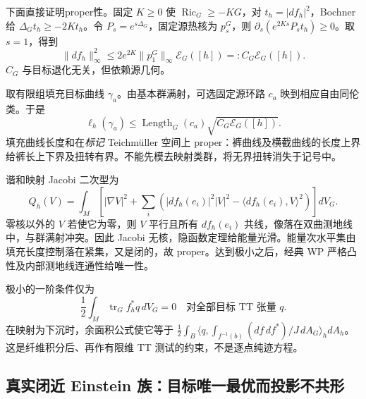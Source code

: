 \documentclass[UTF8,fontset=fandol,zihao=-4,oneside,openany]{ctexbook}
\theoremstyle{cjkplain}
\numberwithin{equation}{chapter}
\begin{document}
下面直接证明proper性。固定 $K\ge0$ 使 $\operatorname{Ric}_G\ge-KG$，对 $t_h=|df_h|^2$，Bochner 给
$\Delta_Gt_h\ge-2Kt_h$。令 $P_s=e^{s\Delta_G}$，固定源热核为 $p_s^G$，则
$\partial_s(e^{2Ks}P_st_h)\ge0$。取 $s=1$，得到
\begin{equation}\label{SUB:heat-kernel-gradient}
\|df_h\|_\infty^2
\le2e^{2K}\|p_1^G\|_\infty\mathcal E_G([h])=:C_G\mathcal E_G([h]).
\end{equation}
$C_G$ 与目标退化无关，但依赖源几何。

取有限组填充目标曲线 $\gamma_a$。由基本群满射，可选固定源环路 $c_a$ 映到相应自由同伦类。于是
\[
\ell_h(\gamma_a)\le\operatorname{Length}_G(c_a)\sqrt{C_G\mathcal E_G([h])}.
\]
填充曲线长度和在\emph{标记} Teichmüller 空间上 proper：裤曲线及横截曲线的长度上界给裤长上下界及扭转有界。不能先模去映射类群，将无界扭转消失于记号中。

谐和映射 Jacobi 二次型为
\[
Q_h(V)=\int_M\left[|\nabla V|^2+
\sum_i(|df_h(e_i)|^2|V|^2-\langle df_h(e_i),V\rangle^2)\right]dV_G.
\]
零核以外的 $V$ 若使它为零，则 $V$ 平行且所有 $df_h(e_i)$ 共线，像落在双曲测地线中，与群满射冲突。因此 Jacobi 无核，隐函数定理给能量光滑。能量次水平集由填充长度控制落在紧集，又是闭的，故 proper。达到极小之后，经典 WP 严格凸性及内部测地线连通性给唯一性。

极小的一阶条件仅为
\begin{equation}\label{SUB:target-stationary}
\frac12\int_M\operatorname{tr}_G f_h^*q\,dV_G=0
\quad\text{对全部目标 TT 张量 }q.
\end{equation}
在映射为下沉时，余面积公式使它等于
$\tfrac12\int_B\langle q,\int_{f^{-1}(b)}(df\,df^*)/J\,dA_G\rangle_h dA_h$。
这是纤维积分后、再作有限维 TT 测试的约束，不是逐点纯迹方程。

\subsection{真实闭近 Einstein 族：目标唯一最优而投影不共形}
\end{document}
